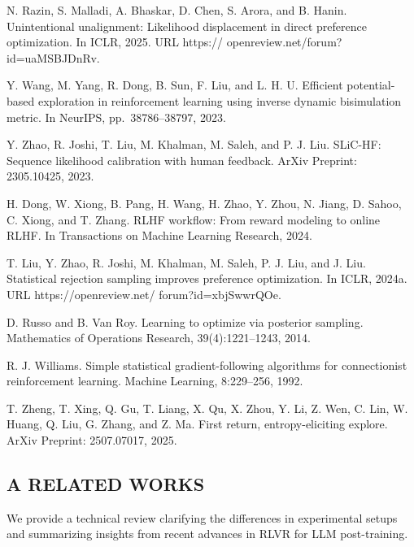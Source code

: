 \documentclass[
  10
]{article}
\begin{document}
N. Razin, S. Malladi, A. Bhaskar, D. Chen, S. Arora, and B. Hanin.
Unintentional unalignment: Likelihood displacement in direct preference
optimization. In ICLR, 2025. URL https://
openreview.net/forum?id=uaMSBJDnRv.

Y. Wang, M. Yang, R. Dong, B. Sun, F. Liu, and L. H. U. Efficient
potential-based exploration in reinforcement learning using inverse
dynamic bisimulation metric. In NeurIPS, pp.~38786--38797, 2023.

Y. Zhao, R. Joshi, T. Liu, M. Khalman, M. Saleh, and P. J. Liu. SLiC-HF:
Sequence likelihood calibration with human feedback. ArXiv Preprint:
2305.10425, 2023.

H. Dong, W. Xiong, B. Pang, H. Wang, H. Zhao, Y. Zhou, N. Jiang, D.
Sahoo, C. Xiong, and T. Zhang. RLHF workflow: From reward modeling to
online RLHF. In Transactions on Machine Learning Research, 2024.

T. Liu, Y. Zhao, R. Joshi, M. Khalman, M. Saleh, P. J. Liu, and J. Liu.
Statistical rejection sampling improves preference optimization. In
ICLR, 2024a. URL https://openreview.net/ forum?id=xbjSwwrQOe.

D. Russo and B. Van Roy. Learning to optimize via posterior sampling.
Mathematics of Operations Research, 39(4):1221--1243, 2014.

R. J. Williams. Simple statistical gradient-following algorithms for
connectionist reinforcement learning. Machine Learning, 8:229--256,
1992.

T. Zheng, T. Xing, Q. Gu, T. Liang, X. Qu, X. Zhou, Y. Li, Z. Wen, C.
Lin, W. Huang, Q. Liu, G. Zhang, and Z. Ma. First return,
entropy-eliciting explore. ArXiv Preprint: 2507.07017, 2025.

\subsection{A RELATED WORKS}\label{a-related-works}

We provide a technical review clarifying the differences in experimental
setups and summarizing insights from recent advances in RLVR for LLM
post-training.
\end{document}
